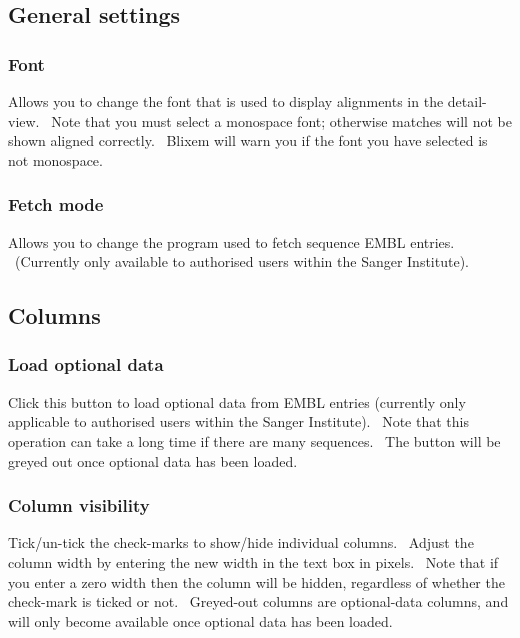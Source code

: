 \documentclass[letterpaper]{article}
\begin{document}
\bigskip

{\color[rgb]{0.30980393,0.5058824,0.7411765}\subsection[General settings]{General settings}}
\hypertarget{RefHeading2421056909880}{}
{\color[rgb]{0.30980393,0.5058824,0.7411765}\subsubsection[Font]{Font}}
\hypertarget{RefHeading2441056909880}{}{
Allows you to change the font that is used to display alignments in the
detail-view. \ Note that you must select a monospace font; otherwise
matches will not be shown aligned correctly. \ Blixem will warn you if
the font you have selected is not monospace.}

\bigskip

{\color[rgb]{0.30980393,0.5058824,0.7411765}\subsubsection[Fetch mode ]{Fetch mode }}
\hypertarget{RefHeading2461056909880}{}{
Allows you to change the program used to fetch sequence EMBL entries.
\ (Currently only available to authorised users within the Sanger
Institute).}

\bigskip

{\color[rgb]{0.30980393,0.5058824,0.7411765}\subsection[Columns]{Columns}}
\hypertarget{RefHeading2481056909880}{}
{\color[rgb]{0.30980393,0.5058824,0.7411765}\subsubsection[Load optional data
]{Load optional data }}
\hypertarget{RefHeading2501056909880}{}
Click this button to load optional data from EMBL entries (currently
only applicable to authorised users within the Sanger Institute).
\ Note that this operation can take a long time if there are many
sequences. \ The button will be greyed out once optional data has been
loaded.

\bigskip

{\color[rgb]{0.30980393,0.5058824,0.7411765}\subsubsection[Column visibility]{Column visibility}}
\hypertarget{RefHeading2521056909880}{}
Tick/un-tick the check-marks to show/hide individual columns. \ Adjust
the column width by entering the new width in the text box in pixels.
\ Note that if you enter a zero width then the column will be hidden,
regardless of whether the check-mark is ticked or not. \ Greyed-out
columns are optional-data columns, and will only become available once
optional data has been loaded.
\end{document}
